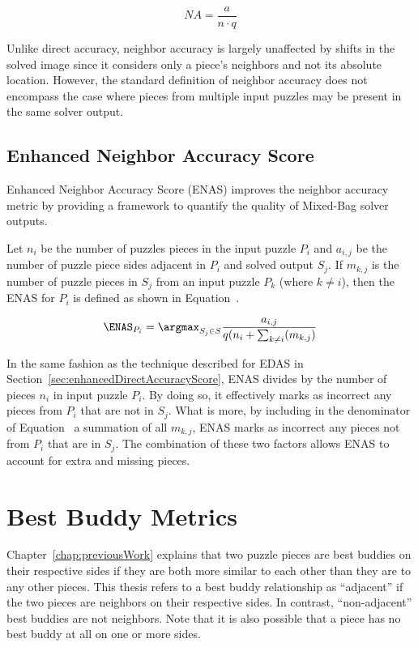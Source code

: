 \begin{equation} \label{eq:neighborAccuracy}
NA = \frac{a}{n \cdot q}
\end{equation}

Unlike direct accuracy, neighbor accuracy is largely unaffected by shifts in the solved image since it considers only a piece's neighbors and not its absolute location.  However, the standard definition of neighbor accuracy does not encompass the case where pieces from multiple input puzzles may be present in the same solver output.  

\subsection{Enhanced Neighbor Accuracy Score}\label{sec:enhancedNeighborAccuracyScore}

Enhanced Neighbor Accuracy Score (ENAS) improves the neighbor accuracy metric by providing a framework to quantify the quality of Mixed-Bag solver outputs. 

Let $n_i$ be the number of puzzles pieces in the input puzzle $P_i$ and $a_{i,j}$ be the number of puzzle piece sides adjacent in $P_i$ and solved output $S_j$.  If $m_{k,j}$ is the number of puzzle pieces in $S_j$ from an input puzzle $P_k$ (where $k \ne i$), then the ENAS for $P_i$ is defined as shown in Equation~.

\begin{equation} \label{eq:enhancedNeighborAccuracyScore}
\ENAS_{P_i} = \argmax_{S_j \in S}\frac{a_{i,j}}{q (n_i + \sum_{k \ne i}(m_{k,j})}
\end{equation}

In the same fashion as the technique described for EDAS in Section~\ref{sec:enhancedDirectAccuracyScore}, ENAS divides by the number of pieces $n_i$ in input puzzle $P_i$.  By doing so, it effectively marks as incorrect any pieces from $P_i$ that are not in $S_j$.  What is more, by including in the denominator of Equation~ a summation of all $m_{k,j}$, ENAS marks as incorrect any pieces not from $P_i$ that are in $S_j$.  The combination of these two factors allows ENAS to account for extra and missing pieces.

\section{Best Buddy Metrics}\label{sec:bestBuddyMetrics}

Chapter~\ref{chap:previousWork} explains that two puzzle pieces are best buddies on their respective sides if they are both more similar to each other than they are to any other pieces.  This thesis refers to a best buddy relationship as ``adjacent'' if the two pieces are neighbors on their respective sides.  In contrast, ``non-adjacent'' best buddies are not neighbors.  Note that it is also possible that a piece has no best buddy at all on one or more sides.

